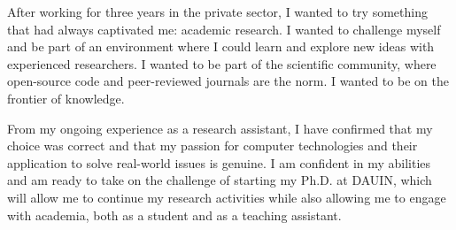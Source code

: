After working for three years in the private sector, I wanted to try something that had always captivated me: academic research. I wanted to challenge myself and be part of an environment where I could learn and explore new ideas with experienced researchers. I wanted to be part of the scientific community, where open-source code and peer-reviewed journals are the norm. I wanted to be on the frontier of knowledge.

From my ongoing experience as a research assistant, I have confirmed that my choice was correct and that my passion for computer technologies and their application to solve real-world issues is genuine. I am confident in my abilities and am ready to take on the challenge of starting my Ph.D. at DAUIN, which will allow me to continue my research activities while also allowing me to engage with academia, both as a student and as a teaching assistant.
